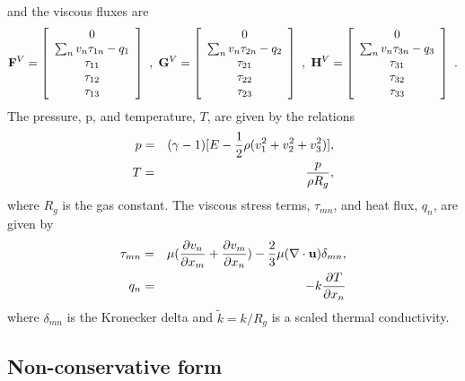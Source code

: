 \documentclass{article}
\begin{document}
and the viscous fluxes are
$$
 {\bf F}^V = \left[ \begin{array}{c}
    0 \\ \sum_n v_n\tau_{1n}-q_1
      \\ \tau_{11} \\  \tau_{12} \\ \tau_{13}
                \end{array}\right]  ~,~
 {\bf G}^V = \left[ \begin{array}{c}
    0 \\ \sum_n v_n\tau_{2n}-q_2
      \\ \tau_{21} \\  \tau_{22} \\ \tau_{23}
                \end{array}\right] ~,~
 {\bf H}^V = \left[ \begin{array}{c}
    0 \\ \sum_n v_n\tau_{3n}-q_3
      \\ \tau_{31} \\  \tau_{32} \\ \tau_{33}
                \end{array}\right]   ~.
$$
The pressure, p, and temperature, $T$, are given by the relations
\begin{eqnarray*}
   p &=& (\gamma-1)[ E - {1\over2} \rho (v_1^2+v_2^2+v_3^2) ], \\
   T &=& {p\over\rho R_g},
\end{eqnarray*}
where $R_g$ is the gas constant.
The viscous stress terms, $\tau_{mn}$, and heat flux, $q_n$, are given by
\begin{eqnarray*}
  \tau_{mn} &=&  \mu( {\partial v_n \over\partial x_m}
                     +{\partial v_m \over\partial x_n}     )
            - {2\over3}\mu( \nabla\cdot{\bf u} ) \delta_{mn}, \\
   q_n &=& -k {\partial T \over \partial x_n} \\
\end{eqnarray*}
where $\delta_{mn}$ is the Kronecker delta and $\tilde{k}=k/R_g$
is a scaled thermal conductivity.



\subsection{Non-conservative form} 
\end{document}
